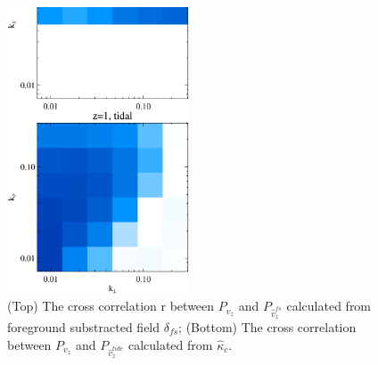 \begin{figure}[tbp]
\begin{center}
\includegraphics[width=0.48\textwidth]{compare_powv2d_z1z2.eps}
\end{center}
\vspace{-0.7cm}
\caption{(Top) The cross correlation r between $P_{v_z}$ and 
    $P_{\hat v_z^{fs}}$ calculated from foreground substracted field $\delta_{fs}$; 
    (Bottom) The cross correlation between $P_{v_z}$ and $P_{\hat v_z^{tide}}$ calculated from $\hat \kappa_c$. 
}
\label{fig:v}
\end{figure}
